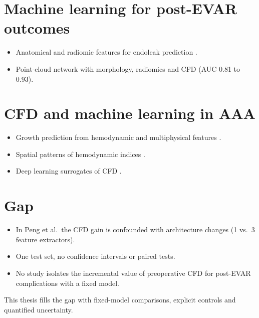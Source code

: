 \section{Machine learning for post-EVAR outcomes}
\begin{itemize}
    \item Anatomical and radiomic features for endoleak prediction \cite{peng_predict_2024}.
    \item Point-cloud network with morphology, radiomics and CFD (AUC 0.81 to 0.93). 
\end{itemize}

\section{CFD and machine learning in AAA}
\begin{itemize}
    \item Growth prediction from hemodynamic and multiphysical features \cite{forneris_ai-powered_2023, kim_deep_2023}.
    \item Spatial patterns of hemodynamic indices \cite{rezaeitaleshmahalleh_characterization_2023}.
    \item Deep learning surrogates of CFD \cite{faisal_rapid_2025, fedotova_automatically_2021}.
\end{itemize}

\section{Gap}
\begin{itemize}
    \item In Peng et al.\ the CFD gain is confounded with architecture changes (1 vs.\ 3 feature extractors). 
    \item One test set, no confidence intervals or paired tests.
    \item No study isolates the incremental value of preoperative CFD for post-EVAR complications with a fixed model.
\end{itemize}
This thesis fills the gap with fixed-model comparisons, explicit controls and quantified uncertainty.
